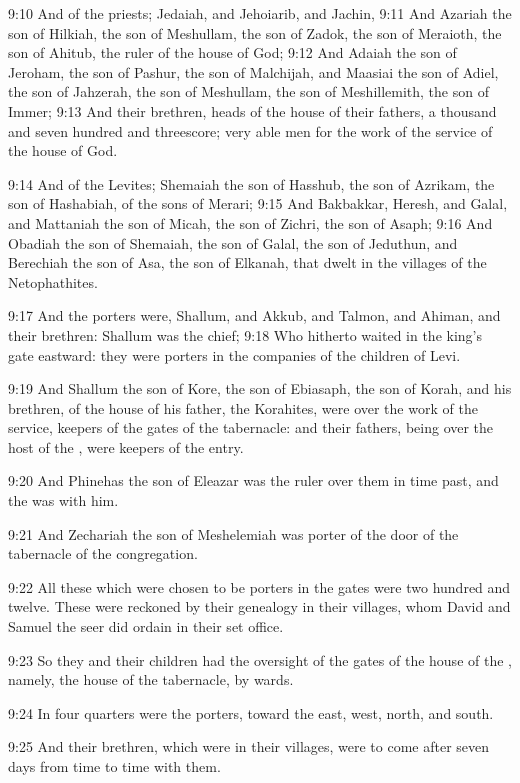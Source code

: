 9:10 And of the priests; Jedaiah, and Jehoiarib, and Jachin, 9:11 And Azariah the son of Hilkiah, the son of Meshullam, the son of Zadok, the son of Meraioth, the son of Ahitub, the ruler of the house of God; 9:12 And Adaiah the son of Jeroham, the son of Pashur, the son of Malchijah, and Maasiai the son of Adiel, the son of Jahzerah, the son of Meshullam, the son of Meshillemith, the son of Immer; 9:13 And their brethren, heads of the house of their fathers, a thousand and seven hundred and threescore; very able men for the work of the service of the house of God.

9:14 And of the Levites; Shemaiah the son of Hasshub, the son of Azrikam, the son of Hashabiah, of the sons of Merari; 9:15 And Bakbakkar, Heresh, and Galal, and Mattaniah the son of Micah, the son of Zichri, the son of Asaph; 9:16 And Obadiah the son of Shemaiah, the son of Galal, the son of Jeduthun, and Berechiah the son of Asa, the son of Elkanah, that dwelt in the villages of the Netophathites.

9:17 And the porters were, Shallum, and Akkub, and Talmon, and Ahiman, and their brethren: Shallum was the chief; 9:18 Who hitherto waited in the king's gate eastward: they were porters in the companies of the children of Levi.

9:19 And Shallum the son of Kore, the son of Ebiasaph, the son of Korah, and his brethren, of the house of his father, the Korahites, were over the work of the service, keepers of the gates of the tabernacle: and their fathers, being over the host of the \LORD, were keepers of the entry.

9:20 And Phinehas the son of Eleazar was the ruler over them in time past, and the \LORD was with him.

9:21 And Zechariah the son of Meshelemiah was porter of the door of the tabernacle of the congregation.

9:22 All these which were chosen to be porters in the gates were two hundred and twelve. These were reckoned by their genealogy in their villages, whom David and Samuel the seer did ordain in their set office.

9:23 So they and their children had the oversight of the gates of the house of the \LORD, namely, the house of the tabernacle, by wards.

9:24 In four quarters were the porters, toward the east, west, north, and south.

9:25 And their brethren, which were in their villages, were to come after seven days from time to time with them.

